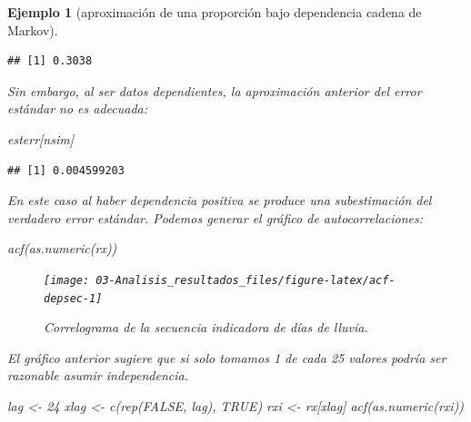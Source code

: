 \documentclass[
]{book}
\newenvironment{Shaded}{\begin{snugshade}}{\end{snugshade}}
\newcommand{\ConstantTok}[1]{\textcolor[rgb]{0.00,0.00,0.00}{#1}}
\newcommand{\DecValTok}[1]{\textcolor[rgb]{0.00,0.00,0.81}{#1}}
\newcommand{\FunctionTok}[1]{\textcolor[rgb]{0.00,0.00,0.00}{#1}}
\newcommand{\NormalTok}[1]{#1}
\newcommand{\OtherTok}[1]{\textcolor[rgb]{0.56,0.35,0.01}{#1}}
\theoremstyle{break}
\newtheorem{example}{Ejemplo}[chapter]
\theoremstyle{nonumberplain}
\begin{document}
\begin{example}[aproximación de una proporción bajo dependencia cadena de Markov]
\begin{verbatim}
## [1] 0.3038
\end{verbatim}

Sin embargo, al ser datos dependientes, la aproximación anterior del error estándar no es adecuada:

\begin{Shaded}
\begin{Highlighting}[]
\NormalTok{esterr[nsim]}
\end{Highlighting}
\end{Shaded}

\begin{verbatim}
## [1] 0.004599203
\end{verbatim}

En este caso al haber dependencia positiva se produce una subestimación del verdadero error estándar.
Podemos generar el gráfico de autocorrelaciones:

\begin{Shaded}
\begin{Highlighting}[]
\FunctionTok{acf}\NormalTok{(}\FunctionTok{as.numeric}\NormalTok{(rx))}
\end{Highlighting}
\end{Shaded}

\begin{figure}[!htb]

{\centering \texttt{[image: 03-Analisis\_resultados\_files/figure-latex/acf-depsec-1]} 

}

\caption{Correlograma de la secuencia indicadora de días de lluvia.}\label{fig:acf-depsec}
\end{figure}

El gráfico anterior sugiere que si solo tomamos 1 de cada 25 valores podría ser razonable asumir independencia.

\begin{Shaded}
\begin{Highlighting}[]
\NormalTok{lag }\OtherTok{\textless{}{-}} \DecValTok{24}
\NormalTok{xlag }\OtherTok{\textless{}{-}} \FunctionTok{c}\NormalTok{(}\FunctionTok{rep}\NormalTok{(}\ConstantTok{FALSE}\NormalTok{, lag), }\ConstantTok{TRUE}\NormalTok{)}
\NormalTok{rxi }\OtherTok{\textless{}{-}}\NormalTok{ rx[xlag]}
\FunctionTok{acf}\NormalTok{(}\FunctionTok{as.numeric}\NormalTok{(rxi))}
\end{Highlighting}
\end{Shaded}

\begin{figure}[!htb]


\end{figure}
\end{example}
\end{document}
